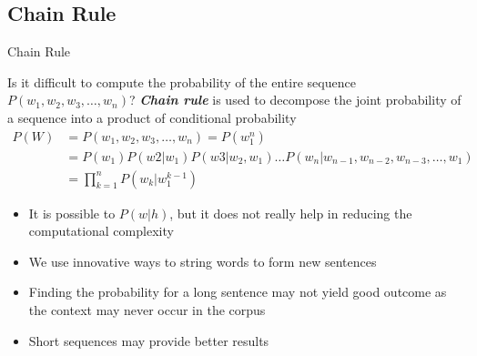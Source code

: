 \subsection{Chain Rule}
\begin{frame}{Chain Rule}

Is it difficult to compute the probability of the entire sequence $P(w_1,w_2,w_3,\ldots,w_n)$?
\linebreak
\textit{\textbf{Chain rule}} is used to decompose the joint probability of a sequence into a product of conditional probability
\begin{align}
P({W}) &= P(w_1,w_2,w_3,\ldots,w_n) = P(w_1^n)\\
&=P(w_1)P(w2|w_1)P(w3|w_2,w_1)\ldots P(w_n|w_{n-1},w_{n-2},w_{n-3},\ldots,w_1)\\
&=\prod_{k=1}^{n}P(w_k|w_1^{k-1})
\end{align}
\begin{itemize}
	\item It is possible to $P(w|h)$, but it does not really help in reducing the computational complexity
	\item We use innovative ways to string words to form new sentences
	\item Finding the probability for a long sentence may not yield good outcome as the context may never occur in the corpus
	\item Short sequences may provide better results
\end{itemize}

\end{frame}


